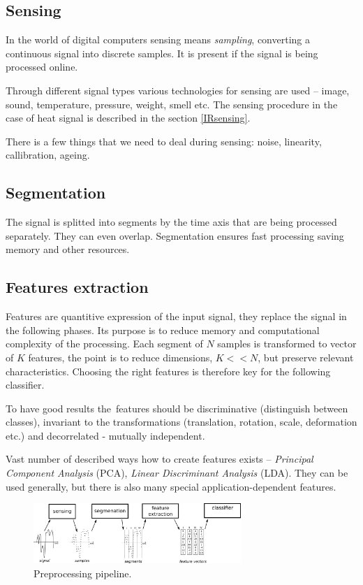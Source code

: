 \subsection*{Sensing}
In the world of digital computers sensing means {\it sampling}, converting a continuous signal
into discrete samples. It is present if the signal is being processed online.

Through different signal types various technologies for sensing are used -- image, sound, temperature,
pressure, weight, smell etc. The sensing procedure in the case of heat signal is described in the section
\ref{IRsensing}.

There is a few things that we need to deal during sensing: noise, linearity, callibration, ageing.

\subsection*{Segmentation}
The signal is splitted into segments by the time axis that are being processed separately. They can even overlap.
Segmentation ensures fast processing saving memory and other resources.

\subsection*{Features extraction}
Features are quantitive expression of the input signal, they replace the signal in the following phases.
Its purpose is to reduce memory and computational complexity of the processing. Each segment of $N$ samples
is transformed to vector of $K$ features, the point is to reduce dimensions, $K << N$, but preserve
relevant characteristics. Choosing the right features is therefore key for the following classifier.

To have good results the~features should be discriminative (distinguish between classes), invariant to
the transformations (translation, rotation, scale, deformation etc.) and decorrelated - mutually independent.

Vast number of described ways how to create features exists -- {\it Principal Component Analysis} (PCA),
{\it Linear Discriminant Analysis} (LDA). They can be used generally, but there is also many special
application-dependent features. 

\begin{figure}[h!]
\begin{center}
\includegraphics[width=0.7\textwidth]{img/featureextraction.png}
\caption{Preprocessing pipeline.\label{fig:featureextraction}}
\end{center}
\end{figure}

